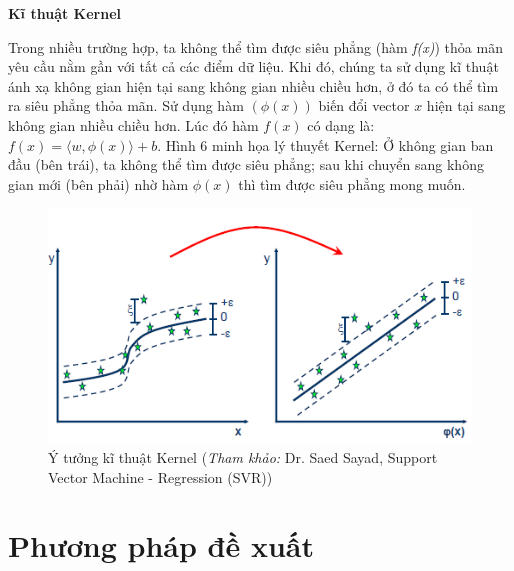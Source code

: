 \documentclass[12pt]{extarticle}
\begin{document}
			\par \textbf{Kĩ thuật Kernel}
			\par Trong nhiều trường hợp, ta không thể tìm được siêu phẳng (hàm \textit{f(x)}) thỏa mãn yêu cầu nằm gần với tất cả các điểm dữ liệu. Khi đó, chúng ta sử dụng kĩ thuật ánh xạ không gian hiện tại sang không gian nhiều chiều hơn, ở đó ta có thể tìm ra siêu phẳng thỏa mãn. Sử dụng hàm $(\phi(x))$ biến đổi vector $x$ hiện tại sang không gian nhiều chiều hơn. Lúc đó hàm $f(x)$ có dạng là: $f(x)=\langle w,\phi(x)\rangle + b$. Hình 6 minh họa lý thuyết Kernel: Ở không gian ban đầu (bên trái), ta không thể tìm được siêu phẳng; sau khi chuyển sang không gian mới (bên phải) nhờ hàm $\phi(x)$ thì tìm được siêu phẳng mong muốn.
				\begin{figure}[h!]
				\includegraphics[width=\linewidth]{kernel}
				\caption[Ý tưởng kĩ thuật Kernel]{Ý tưởng kĩ thuật Kernel (\textit{Tham khảo:} Dr. Saed Sayad, Support Vector Machine - Regression (SVR))}
				\label{fig:svr}
			\end{figure}
	\section{Phương pháp đề xuất}								
\end{document}

